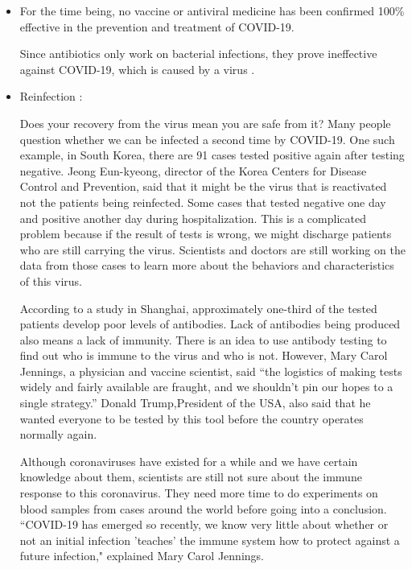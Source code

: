 \begin{itemize}
      \item For the time being, no vaccine or antiviral medicine has been confirmed 100\% effective in the prevention and treatment of COVID-19.
      \par Since antibiotics only work on bacterial infections, they prove ineffective against COVID-19, which is caused by a virus \parencite{Q&A_WHO}.
      \item Reinfection \parencite{Reinfection_abcnews} \parencite{Reinfection_independent}:
      \par Does your recovery from the virus mean you are safe from it? Many people question whether we can be infected a second time by COVID-19. One such example, in South Korea, there are 91 cases tested positive again after testing negative. Jeong Eun-kyeong, director of the Korea Centers for Disease Control and Prevention, said that it might be the virus that is reactivated not the patients being reinfected. Some cases that tested negative one day and positive another day during hospitalization. This is a complicated problem because if the result of tests is wrong, we might discharge patients who are still carrying the virus. Scientists and doctors are still working on the data from those cases to learn more about the behaviors and characteristics of this virus.
      \par According to a study in Shanghai, approximately one-third of the tested patients develop poor levels of antibodies. Lack of antibodies being produced also means a lack of immunity. There is an idea to use antibody testing to find out who is immune to the virus and who is not. However, Mary Carol Jennings, a physician and vaccine scientist, said “the logistics of making tests widely and fairly available are fraught, and we shouldn't pin our hopes to a single strategy.” Donald Trump,President of the USA, also said that he wanted everyone to be tested by this tool before the country operates normally again.
      \par Although coronaviruses have existed for a while and we have certain knowledge about them, scientists are still not sure about the immune response to this coronavirus. They need more time to do experiments on blood samples from cases around the world before going into a conclusion. ``COVID-19 has emerged so recently, we know very little about whether or not an initial infection 'teaches' the immune system how to protect against a future infection," explained Mary Carol Jennings.
    \end{itemize}

